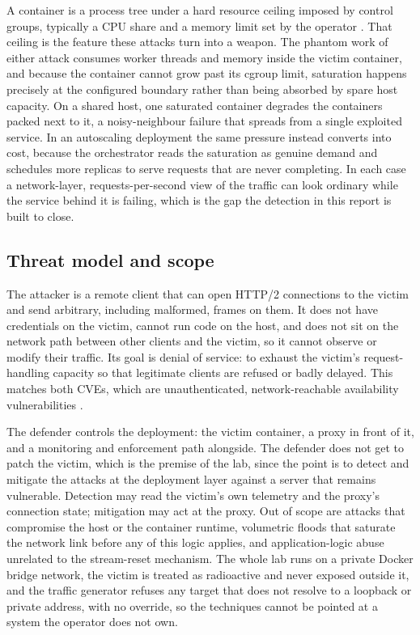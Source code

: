 \documentclass[a4paper,fleqn]{cas-dc}
\begin{document}
A container is a process tree under a hard resource ceiling imposed by control groups, typically a CPU share and a memory limit set by the operator \cite{dockerDocs}. That ceiling is the feature these attacks turn into a weapon. The phantom work of either attack consumes worker threads and memory inside the victim container, and because the container cannot grow past its cgroup limit, saturation happens precisely at the configured boundary rather than being absorbed by spare host capacity. On a shared host, one saturated container degrades the containers packed next to it, a noisy-neighbour failure that spreads from a single exploited service. In an autoscaling deployment the same pressure instead converts into cost, because the orchestrator reads the saturation as genuine demand and schedules more replicas to serve requests that are never completing. In each case a network-layer, requests-per-second view of the traffic can look ordinary while the service behind it is failing, which is the gap the detection in this report is built to close.

\subsection{Threat model and scope}\label{sec:threat-model}

The attacker is a remote client that can open HTTP/2 connections to the victim and send arbitrary, including malformed, frames on them. It does not have credentials on the victim, cannot run code on the host, and does not sit on the network path between other clients and the victim, so it cannot observe or modify their traffic. Its goal is denial of service: to exhaust the victim's request-handling capacity so that legitimate clients are refused or badly delayed. This matches both CVEs, which are unauthenticated, network-reachable availability vulnerabilities \cite{cve20258671,cve202344487}.

The defender controls the deployment: the victim container, a proxy in front of it, and a monitoring and enforcement path alongside. The defender does not get to patch the victim, which is the premise of the lab, since the point is to detect and mitigate the attacks at the deployment layer against a server that remains vulnerable. Detection may read the victim's own telemetry and the proxy's connection state; mitigation may act at the proxy. Out of scope are attacks that compromise the host or the container runtime, volumetric floods that saturate the network link before any of this logic applies, and application-logic abuse unrelated to the stream-reset mechanism. The whole lab runs on a private Docker bridge network, the victim is treated as radioactive and never exposed outside it, and the traffic generator refuses any target that does not resolve to a loopback or private address, with no override, so the techniques cannot be pointed at a system the operator does not own.
\end{document}
